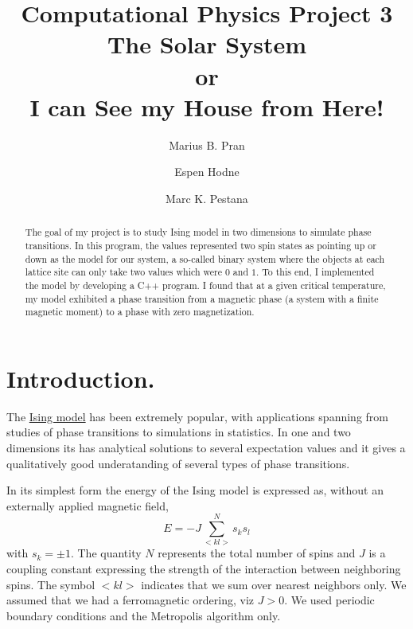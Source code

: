 \documentclass[10pt,showpacs,preprintnumbers,footinbib,amsmath,amssymb,aps,prl,twocolumn,groupedaddress,superscriptaddress,showkeys]{revtex4-1}
\begin{document}
\title[CPP2]{Computational Physics Project 3\\
\large{The Solar System}\\
or\\
I can See my House from Here!}

\author{Marius B. Pran}
\author{Espen Hodne} 
\author{Marc K. Pestana}

\begin{abstract}
The goal of my project is to study Ising model in two dimensions to simulate phase transitions. In this program, the values represented two spin states as pointing up or down as the model for our system, a so-called binary system where the objects at each lattice site can only take two values which were $0$ and $1$. To this end, I implemented the model by developing a C++ program. I found that at a given critical temperature, my model exhibited a phase transition from a magnetic phase (a system with a finite magnetic moment) to a phase with zero magnetization.
\end{abstract}


\maketitle



\section{Introduction.}
The \href{{https://en.wikipedia.org/wiki/Ising_model}}{Ising model} has been extremely popular, with applications spanning from studies of phase transitions to simulations in statistics. In one and two dimensions its has analytical solutions to several expectation values and it gives a qualitatively  good underatanding of several types of phase transitions.  

In its simplest form
the energy of the Ising model is expressed as, without an externally applied magnetic field, 
\[
E=-J\sum_{< kl >}^{N}s_ks_l 
\]
with
$s_k=\pm 1$. The quantity $N$ represents the total number of spins and $J$ is a coupling
constant expressing the strength of the interaction between
neighboring spins.  The symbol $<kl>$ indicates that we sum over
nearest neighbors only. We assumed that we had a ferromagnetic
ordering, viz $J> 0$.  We used periodic boundary conditions and
the Metropolis algorithm only. 
\end{document}
